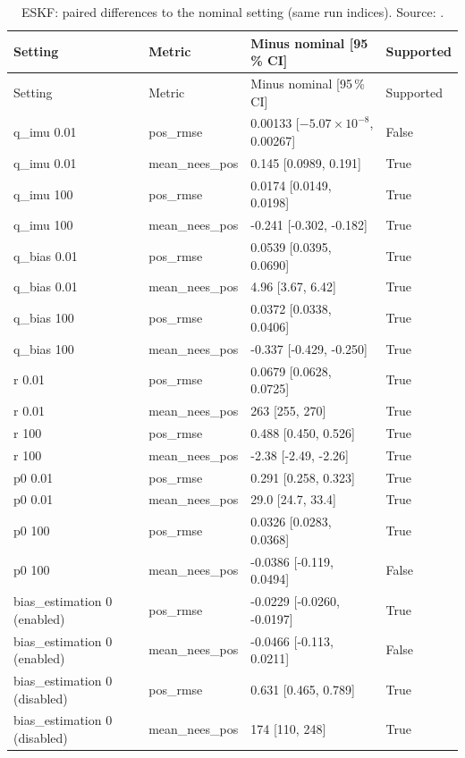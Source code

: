 {\small
\begin{longtable}{llll}
\caption{ESKF: paired differences to the nominal setting (same run indices). Source: .}\label{tab:es_paired}\\
\toprule
Setting & Metric & Minus nominal [95\,\% CI] & Supported \\
\midrule
\endfirsthead
\toprule
Setting & Metric & Minus nominal [95\,\% CI] & Supported \\
\midrule
\endhead
q\_imu 0.01 & pos\_rmse & 0.00133 [$-5.07\times10^{-8}$, 0.00267] & False \\
q\_imu 0.01 & mean\_nees\_pos & 0.145 [0.0989, 0.191] & True \\
q\_imu 100 & pos\_rmse & 0.0174 [0.0149, 0.0198] & True \\
q\_imu 100 & mean\_nees\_pos & -0.241 [-0.302, -0.182] & True \\
q\_bias 0.01 & pos\_rmse & 0.0539 [0.0395, 0.0690] & True \\
q\_bias 0.01 & mean\_nees\_pos & 4.96 [3.67, 6.42] & True \\
q\_bias 100 & pos\_rmse & 0.0372 [0.0338, 0.0406] & True \\
q\_bias 100 & mean\_nees\_pos & -0.337 [-0.429, -0.250] & True \\
r 0.01 & pos\_rmse & 0.0679 [0.0628, 0.0725] & True \\
r 0.01 & mean\_nees\_pos & 263 [255, 270] & True \\
r 100 & pos\_rmse & 0.488 [0.450, 0.526] & True \\
r 100 & mean\_nees\_pos & -2.38 [-2.49, -2.26] & True \\
p0 0.01 & pos\_rmse & 0.291 [0.258, 0.323] & True \\
p0 0.01 & mean\_nees\_pos & 29.0 [24.7, 33.4] & True \\
p0 100 & pos\_rmse & 0.0326 [0.0283, 0.0368] & True \\
p0 100 & mean\_nees\_pos & -0.0386 [-0.119, 0.0494] & False \\
bias\_estimation 0 (enabled) & pos\_rmse & -0.0229 [-0.0260, -0.0197] & True \\
bias\_estimation 0 (enabled) & mean\_nees\_pos & -0.0466 [-0.113, 0.0211] & False \\
bias\_estimation 0 (disabled) & pos\_rmse & 0.631 [0.465, 0.789] & True \\
bias\_estimation 0 (disabled) & mean\_nees\_pos & 174 [110, 248] & True \\

\end{longtable}}
